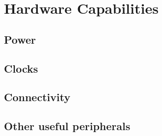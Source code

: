 \section{Hardware Capabilities}

\subsection{Power}

\subsection{Clocks}

\subsection{Connectivity}

\subsection{Other useful peripherals}
